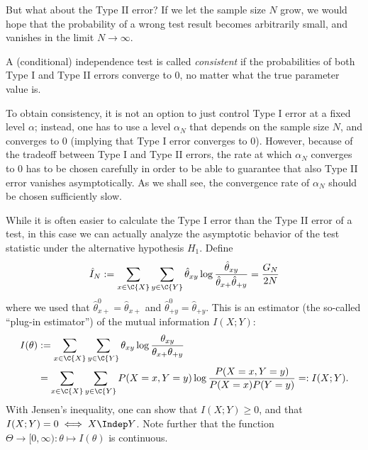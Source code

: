 But what about the Type II error? 
If we let the sample size $N$ grow, we would hope that the probability of a wrong test result becomes arbitrarily small, and
vanishes in the limit $N \to \infty$. 
\begin{Def}
A (conditional) independence test is called \emph{consistent} if the probabilities of both Type I and Type II errors converge to 0, no matter what the true parameter value is.
\end{Def}
To obtain consistency, it is not an option to just control Type I error at a fixed level $\alpha$; instead, one has to use a level $\alpha_N$
that depends on the sample size $N$, and converges to 0 (implying that Type I error converges to 0). However, because of the
tradeoff between Type I and Type II errors, the rate at which $\alpha_N$ converges to $0$ has to be chosen carefully in order to
be able to guarantee that also Type II error vanishes asymptotically. As we shall see, the convergence rate of $\alpha_N$ should be chosen
sufficiently slow.

While it is often easier to calculate the Type I error than the Type II error of
a test, in this case we can actually analyze the asymptotic behavior of the test statistic under the alternative hypothesis $H_1$.
Define
$$\hat I_N := \sum_{x\in\C{X}} \sum_{y\in\C{Y}} \hat \theta_{xy} \log \frac{\hat \theta_{xy}}{\hat \theta_{x+} \hat \theta_{+ y}}
    = \frac{G_N}{2N}$$
where we used that $\hat\theta^0_{x +} = \hat\theta_{x +}$ and $\hat\theta^0_{+ y} = \hat\theta_{+ y}$.
This is an estimator (the so-called ``plug-in estimator'') of the mutual information $I(X;Y)$:
\begin{equation*}\begin{split}
  I(\theta) & := \sum_{x\in\C{X}}\sum_{y\in\C{Y}} \theta_{xy} \log \frac{\theta_{xy}}{\theta_{x +} \theta_{+ y}} \\
  & = \sum_{x\in\C{X}} \sum_{y\in\C{Y}} P(X=x,Y=y) \log \frac{P(X=x,Y=y)}{P(X=x) P(Y=y)} =: I(X;Y).
\end{split}\end{equation*}
With Jensen's inequality, one can show that $I(X;Y) \ge 0$, and that $I(X;Y) = 0 \iff X \Indep Y$.
Note further that the function $\Theta \to [0,\infty) : \theta \mapsto I(\theta)$ is continuous.

